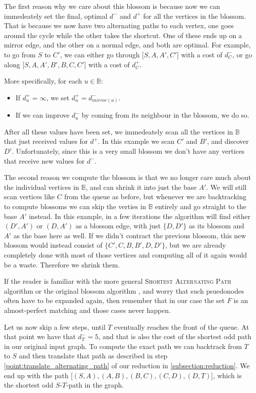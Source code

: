 The first reason why we care about this blossom is because now we can immedeately set the final, optimal $d^-$ and $d^+$ for all the vertices in the blossom. That is because we now have two alternating paths to each vertex, one goes around the cycle while the other takes the shortcut. One of these ends up on a mirror edge, and the other on a normal edge, and both are optimal. For example, to go from $S$ to $C'$, we can either go through [$S,A,A',C'$] with a cost of $d^-_C$, or go along [$S,A,A',B',B,C,C'$] with a cost of $d^+_C$.

More specifically, for each $u \in \mathbb{B}$: \begin{itemize}
    \item If $d^+_u = \infty$, we set $d^+_u = d^-_{mirror(u)}$.
    \item If we can improve $d^-_u$ by coming from its neighbour in the blossom, we do so.
\end{itemize}
After all these values have been set, we immedeately scan all the vertices in $\mathbb{B}$ that just received values for $d^+$. In this example we scan $C'$ and $B'$, and discover $D'$. Unfortunately, since this is a very small blossom we don't have any vertices that receive new values for $d^-$.



The second reason we compute the blossom is that we no longer care much about the individual vertices in $\mathbb{B}$, and can shrink it into just the base $A'$. We will still scan vertices like $C$ from the queue as before, but whenever we are backtracking to compute blossoms we can skip the verties in $\mathbb{B}$ entirely and go straight to the base $A'$ instead. In this example, in a few iterations the algorithm will find either $(D',A')$ or $(D,A')$ as a blossom edge, with just $\{D,D'\}$ as its blossom and $A'$ as the base here as well. If we didn't contract the previous blossom, this new blossom would instead consist of $\{C',C,B,B',D,D'\}$, but we are already completely done with most of those vertices and computing all of it again would be a waste. Therefore we shrink them. 

If the reader is familiar with the more general \textsc{Shortest Alternating Path} algorithm \cite{source:shortest_alternating_path} or the original blossom algorithm \cite{source:blossom}, and worry that such psuedonodes often have to be expanded again, then remember that in our case the set $F$ is an almost-perfect matching and those cases never happen. 



Let us now skip a few steps, until $T$ eventually reaches the front of the queue. At that point we have that $d^-_T = 5$, and that is also the cost of the shortest odd path in our original input graph. To compute the exact path we can backtrack from $T$ to $S$ and then translate that path as described in step \ref{point:translate_alternating_path} of our reduction in \ref{subsection:reduction}. We end up with the path [$(S,A),(A,B),(B,C),(C,D),(D,T)$], which is the shortest odd $S$-$T$-path in the graph.
